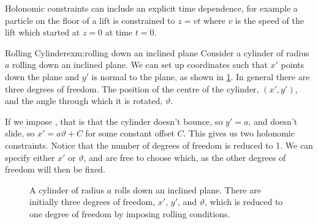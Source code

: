 \documentclass[fleqn]{NotesClass}
\begin{document}
    Holonomic constraints can include an explicit time dependence, for example a particle on the floor of a lift is constrained to \(z = vt\) where \(v\) is the speed of the lift which started at \(z = 0\) at time \(t = 0\).
    
    \begin{exm}{Rolling Cylinder}{exm:rolling down an inclined plane}
        Consider a cylinder of radius \(a\) rolling down an inclined plane.
        We can set up coordinates such that \(x'\) points down the plane and \(y'\) is normal to the plane, as shown in \cref{fig:rolling down an inclined plane}.
        In general there are three degrees of freedom.
        The position of the centre of the cylinder, \((x', y')\), and the angle through which it is rotated, \(\vartheta\).
        
        If we impose , that is that the cylinder doesn't bounce, so \(y' = a\), and doesn't slide, so \(x' = a\vartheta + C\) for some constant offset \(C\).
        This gives us two holonomic constraints.
        Notice that the number of degrees of freedom is reduced to 1.
        We can specify either \(x'\) or \(\vartheta\), and are free to choose which, as the other degrees of freedom will then be fixed.
    \end{exm}
    
    \begin{figure}
        \caption{A cylinder of radius \(a\) rolls down an inclined plane. There are initially three degrees of freedom, \(x'\), \(y'\), and \(\vartheta\), which is reduced to one degree of freedom by imposing rolling conditions.}
        \label{fig:rolling down an inclined plane}
    \end{figure}
    
\end{document}
